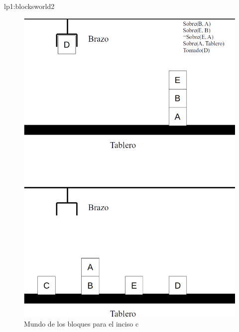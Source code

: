 \begin{defproblem}{lp1:blocksworld2}
\begin{onlyproblem}
		\begin{figure}
			\centering
			\includegraphics[width=0.7\linewidth]{Blocksworld2}
			\caption{Mundo de los bloques para el inciso c}
			\label{fig:blocksworld2}
		\end{figure}
	\end{onlyproblem}%
	\begin{onlysolution}%
		
	\end{onlysolution}%
\end{defproblem}


